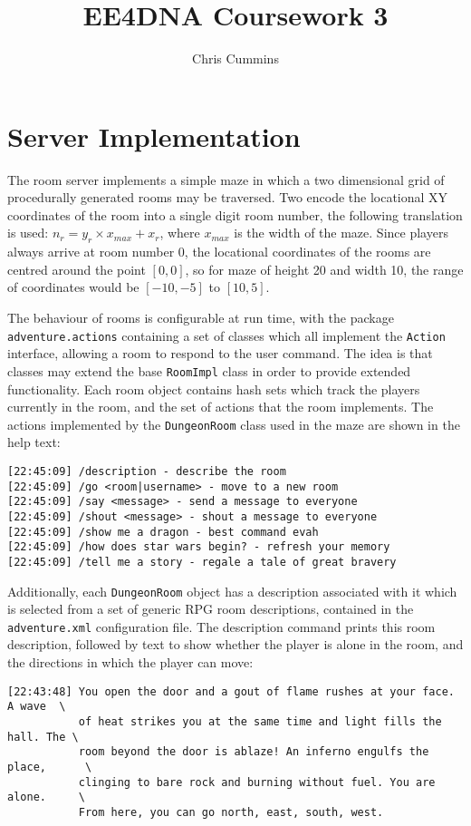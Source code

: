 \documentclass[12pt,a4paper]{article}
\title{EE4DNA Coursework 3}
\author{Chris Cummins}
\begin{document}
\maketitle

\section{Server Implementation}

The room server implements a simple maze in which a two dimensional
grid of procedurally generated rooms may be traversed. Two encode the
locational XY coordinates of the room into a single digit room number,
the following translation is used: $n_r = y_r \times x_{max} + x_r$,
where $x_{max}$ is the width of the maze. Since players always arrive
at room number 0, the locational coordinates of the rooms are centred
around the point $[0, 0]$, so for maze of height 20 and width 10, the
range of coordinates would be $[-10, -5]$ to $[10, 5]$.

The behaviour of rooms is configurable at run time, with the package
\texttt{adventure.actions} containing a set of classes which all
implement the \texttt{Action} interface, allowing a room to respond to
the user command. The idea is that classes may extend the base
\texttt{RoomImpl} class in order to provide extended functionality.
Each room object contains hash sets which track the players currently
in the room, and the set of actions that the room implements. The
actions implemented by the \texttt{DungeonRoom} class used in the maze
are shown in the help text:

\begin{verbatim}
[22:45:09] /description - describe the room
[22:45:09] /go <room|username> - move to a new room
[22:45:09] /say <message> - send a message to everyone
[22:45:09] /shout <message> - shout a message to everyone
[22:45:09] /show me a dragon - best command evah
[22:45:09] /how does star wars begin? - refresh your memory
[22:45:09] /tell me a story - regale a tale of great bravery
\end{verbatim}

Additionally, each \texttt{DungeonRoom} object has a description
associated with it which is selected from a set of generic RPG room
descriptions, contained in the \texttt{adventure.xml} configuration
file. The description command prints this room description, followed
by text to show whether the player is alone in the room, and the
directions in which the player can move:

\begin{verbatim}
[22:43:48] You open the door and a gout of flame rushes at your face. A wave  \
           of heat strikes you at the same time and light fills the hall. The \
           room beyond the door is ablaze! An inferno engulfs the place,      \
           clinging to bare rock and burning without fuel. You are alone.     \
           From here, you can go north, east, south, west.
\end{verbatim}
\end{document}
